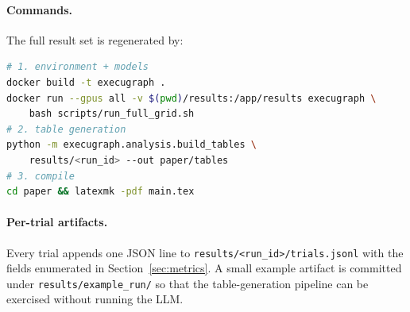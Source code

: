 \documentclass[journal]{IEEEtran}
\begin{document}
\paragraph{Commands.} The full result set is regenerated by:
\begin{lstlisting}[language=bash]
# 1. environment + models
docker build -t execugraph .
docker run --gpus all -v $(pwd)/results:/app/results execugraph \
    bash scripts/run_full_grid.sh
# 2. table generation
python -m execugraph.analysis.build_tables \
    results/<run_id> --out paper/tables
# 3. compile
cd paper && latexmk -pdf main.tex
\end{lstlisting}

\paragraph{Per-trial artifacts.} Every trial appends one JSON line to \texttt{results/<run\_id>/trials.jsonl} with the fields enumerated in Section~\ref{sec:metrics}. A small example artifact is committed under \texttt{results/example\_run/} so that the table-generation pipeline can be exercised without running the LLM.




\end{document}
